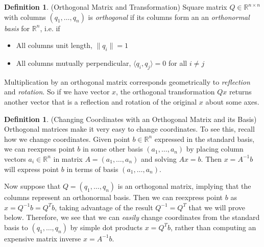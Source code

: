 \documentclass[12pt]{article}
\numberwithin{equation}{section} %
\theoremstyle{plain}
\theoremstyle{definition}
\newtheorem{defn}[thm]{Definition}
\theoremstyle{remark}
\newcommand{\Rn}{\mathbb{R}^n}
\newcommand{\Rnn}{\mathbb{R}^{n\times n}}
\begin{document}
\begin{defn}(Orthogonal Matrix and Transformation)
Square matrix $Q\in\Rnn$ with columns $(q_1,\ldots,q_n)$ is
\emph{orthogonal} if its columns form an an \emph{orthonormal basis} for
$\Rn$, i.e. if
\begin{itemize}
  \item All columns unit length, $\lVert q_i\rVert = 1$
  \item All columns mutually perpendicular,
    $\langle q_i, q_j\rangle =0$ for all $i\neq j$
\end{itemize}
Multiplication by an orthogonal matrix corresponds geometrically to
\emph{reflection} and \emph{rotation}. So if we have vector $x$, the
orthogonal transformation $Qx$ returns another vector that is a
reflection and rotation of the original $x$ about some axes.
\end{defn}

\begin{defn}(Changing Coordinates with an Orthogonal Matrix and its Basis)
Orthogonal matrices make it very easy to change coordinates.
To see this, recall how we change coordinates.
Given point $b\in\Rn$ expressed in the standard basis, we can reexpress
point $b$ in some other basis $(a_1,\ldots,a_n)$ by placing column
vectors $a_i\in\Rn$ in matrix $A=(a_1,\ldots,a_n)$ and solving $Ax=b$.
Then $x=A^{-1}b$ will express point $b$ in terms of basis
$(a_1,\ldots,a_n)$.

Now suppose that $Q=(q_1,\ldots,q_n)$ is an
orthogonal matrix, implying that the columns represent an orthonormal
basis. Then we can reexpress point $b$ as $x=Q^{-1}b=Q^Tb$, taking
advantage of the result $Q^{-1}=Q^T$ that we will prove below.
Therefore, we see that we can \emph{easily} change coordinates from the
standard basis to $(q_1,\ldots,q_n)$ by simple dot products $x=Q^Tb$,
rather than computing an expensive matrix inverse $x=A^{-1}b$.
\end{defn}
\end{document}
